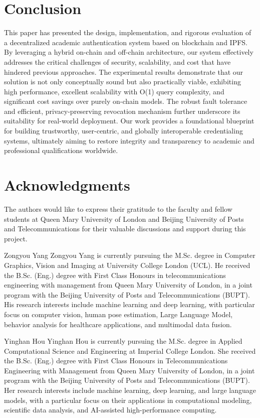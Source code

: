 \documentclass[lettersize,journal]{IEEEtran}
\begin{document}
\begin{itemize}
\section{Conclusion}
This paper has presented the design, implementation, and rigorous evaluation of a decentralized academic authentication system based on blockchain and IPFS. By leveraging a hybrid on-chain and off-chain architecture, our system effectively addresses the critical challenges of security, scalability, and cost that have hindered previous approaches. The experimental results demonstrate that our solution is not only conceptually sound but also practically viable, exhibiting high performance, excellent scalability with O(1) query complexity, and significant cost savings over purely on-chain models. The robust fault tolerance and efficient, privacy-preserving revocation mechanism further underscore its suitability for real-world deployment. Our work provides a foundational blueprint for building trustworthy, user-centric, and globally interoperable credentialing systems, ultimately aiming to restore integrity and transparency to academic and professional qualifications worldwide.

\section*{Acknowledgments}
The authors would like to express their gratitude to the faculty and fellow students at Queen Mary University of London and Beijing University of Posts and Telecommunications for their valuable discussions and support during this project.



\begin{IEEEbiographynophoto}{Zongyou Yang}
Zongyou Yang is currently pursuing the M.Sc. degree in Computer Graphics, Vision and Imaging at University College London (UCL). He received the B.Sc. (Eng.) degree with First Class Honours in telecommunications engineering with management from Queen Mary University of London, in a joint program with the Beijing University of Posts and Telecommunications (BUPT). His research interests include machine learning and deep learning, with particular focus on computer vision, human pose estimation, Large Language Model, behavior analysis for healthcare applications, and multimodal data fusion.
\end{IEEEbiographynophoto}

\begin{IEEEbiographynophoto}{Yinghan Hou}
Yinghan Hou is currently pursuing the M.Sc. degree in Applied Computational Science and Engineering at Imperial College London. She received the B.Sc. (Eng.) degree with First Class Honours in Telecommunications Engineering with Management from Queen Mary University of London, in a joint program with the Beijing University of Posts and Telecommunications (BUPT). Her research interests include machine learning, deep learning, and large language models, with a particular focus on their applications in computational modeling, scientific data analysis, and AI-assisted high-performance computing.
\end{IEEEbiographynophoto}


\end{itemize}
\end{document}
